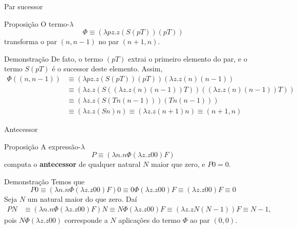 \begin{frame}[fragile]{Par sucessor}

    \begin{block}{Proposição}
    O termo-$\lambda$
    \[
        \Phi \equiv (\lambda pz.z(S(pT))(pT))
    \]
    transforma o par $(n, n - 1)$ no par $(n + 1, n)$.
    \end{block}

    \begin{block}{Demonstração}
    De fato, o termo $(pT)$ extrai o primeiro elemento do par, e o termo $S(pT)$ é o sucessor
    deste elemento. Assim,
    \begin{align*}
        \Phi ((n, n - 1)) &\equiv  (\lambda pz.z(S(pT))(pT))(\lambda z.z(n)(n-1)) \\
        &\equiv  (\lambda z.z(S((\lambda z.z(n)(n-1))T))((\lambda z.z(n)(n-1))T)) \\
        &\equiv  (\lambda z.z(S(Tn(n-1)))(Tn(n-1))) \\
        &\equiv  (\lambda z.z(Sn)n) \equiv  (\lambda z.z(n + 1)n) \equiv (n + 1, n)
    \end{align*}
    \end{block}

\end{frame}

\begin{frame}[fragile]{Antecessor}

    \begin{block}{Proposição}
    A expressão-$\lambda$
    \[
        P \equiv (\lambda n.n\Phi (\lambda z.z00)F)
    \]
    computa o \textbf{antecessor} de qualquer natural $N$ maior que zero, e $P0 = 0$.
    \end{block}

    \begin{block}{Demonstração}
    Temos que
    \[
        P0 \equiv (\lambda n.n\Phi (\lambda z.z00)F)0 \equiv 0\Phi (\lambda z.z00) F
        \equiv (\lambda z.z00)F \equiv 0
    \]
    Seja $N$ um natural maior do que zero. Daí
    \begin{align*}
        PN &\equiv (\lambda n.n\Phi (\lambda z.z00)F)N \equiv N\Phi (\lambda z.z00) F \equiv (\lambda z.zN(N - 1))F \equiv N - 1,
    \end{align*}
    pois $N\Phi (\lambda z.z00)$ corresponde a $N$ aplicações do termo $\Phi$ ao par $(0, 0)$.
    \end{block}
\end{frame}

